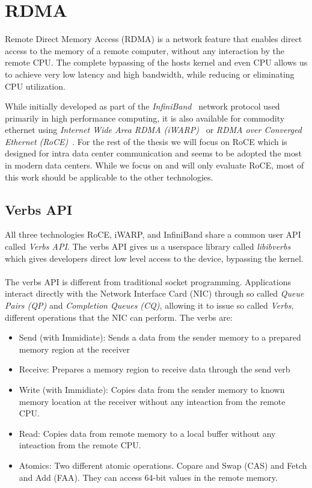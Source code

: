 \section{RDMA}

Remote Direct Memory Access (RDMA) is a network feature that enables direct access to the memory of a remote computer, 
without any interaction by the remote CPU. The complete bypassing of the hosts kernel and even CPU allows us to achieve 
very low latency and high bandwidth, while reducing or eliminating CPU utilization.

While initially developed as part of the \emph{InfiniBand}~\cite{} network protocol used primarily in high performance computing,
it is also available for commodity ethernet using \emph{Internet Wide Area RDMA (iWARP)}~\cite{} or
\emph{RDMA over Converged Ethernet (RoCE)}~\cite{}. For the rest of the thesis we will focus on RoCE which is designed for 
intra data center communication and seems to be adopted the most in modern data centers. 
While we focus on and will only evaluate RoCE, most of this work should be applicable to the other technologies.



\subsection{Verbs API}

All three technologies RoCE, iWARP, and InfiniBand share a common user API called \emph{Verbs API}. The verbs API gives us a
userspace library called \emph{libibverbs} which gives developers direct low level access to the device, bypassing the kernel.

\paragraph{}The verbs API is different from traditional socket programming. Applications interact directly with the Network 
Interface Card (NIC) through so called \emph{Queue Pairs (QP)} and \emph{Completion Queues (CQ)}, allowing it to issue
so called \emph{Verbs}, different operations that the NIC can perform. The verbs are:

\begin{itemize}
  \item Send (with Immidiate): Sends a data from the sender memory to a prepared memory region at the receiver
  \item Receive: Prepares a memory region to receive data through the send verb
  \item Write (with Immidiate): Copies data from the sender memory to known memory location at the receiver without any 
    inteaction from the remote CPU.
  \item Read: Copies data from remote memory to a local buffer without any inteaction from the remote CPU.
  \item Atomics: Two different atomic operations. Copare and Swap (CAS) and Fetch and Add (FAA). They can access 64-bit 
    values in the remote memory. 
\end{itemize}



